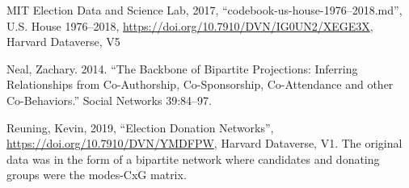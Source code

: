 \documentclass[]{article}
\begin{document}
MIT Election Data and Science Lab, 2017,
``codebook-us-house-1976--2018.md'', U.S. House 1976--2018,
\url{https://doi.org/10.7910/DVN/IG0UN2/XEGE3X}, Harvard Dataverse, V5

Neal, Zachary. 2014. ``The Backbone of Bipartite Projections: Inferring
Relationships from Co-Authorship, Co-Sponsorship, Co-Attendance and
other Co-Behaviors.'' Social Networks 39:84--97.

Reuning, Kevin, 2019, ``Election Donation Networks'',
\url{https://doi.org/10.7910/DVN/YMDFPW}, Harvard Dataverse, V1. The
original data was in the form of a bipartite network where candidates
and donating groups were the modes-CxG matrix.
\end{document}
